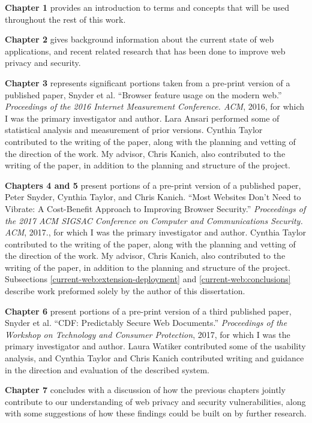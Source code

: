 \authorcontributions

\textbf{Chapter 1} provides an introduction to terms and concepts that will be
used throughout the rest of this work.

\textbf{Chapter 2} gives background information about the current state of web
applications, and recent related research that has been done to improve web
privacy and security.

\textbf{Chapter 3} represents significant portions taken from a pre-print
version of a published paper, Snyder et al. ``Browser feature usage on
the modern web.'' \textit{Proceedings of the 2016 Internet Measurement
Conference. ACM}, 2016, for which I was the primary investigator and author.
Lara Ansari performed some of statistical analysis and measurement of prior \FF
versions.  Cynthia Taylor contributed to the writing of the paper, along with
the planning and vetting of the direction of the work.  My advisor, Chris
Kanich, also contributed to the writing of the paper, in addition to the
planning and structure of the project.

\textbf{Chapters 4 and 5} present portions of a pre-print version of a
published paper, Peter Snyder, Cynthia Taylor, and Chris Kanich. ``Most
Websites Don't Need to Vibrate: A Cost-Benefit Approach to Improving Browser
Security.'' \textit{Proceedings of the 2017 ACM SIGSAC Conference on Computer
and Communications Security. ACM}, 2017., for which I was the primary
investigator and author.  Cynthia Taylor contributed to the writing of the
paper, along with the planning and vetting of the direction of the work.  My
advisor, Chris Kanich, also contributed to the writing of the paper, in
addition to the planning and structure of the project.  Subsections
\ref{current-web:extension-deployment} and \ref{current-web:conclusions}
describe work preformed solely by the author of this dissertation.

\textbf{Chapter 6} present portions of a pre-print version of a third published
paper, Snyder et al. ``CDF: Predictably Secure Web Documents.''
\textit{Proceedings of the Workshop on Technology and Consumer Protection},
2017, for which I was the primary investigator and author.  Laura Watiker
contributed some of the usability analysis, and Cynthia Taylor and Chris
Kanich contributed writing and guidance in the direction and evaluation of the
described system.

\textbf{Chapter 7} concludes with a discussion of how the previous chapters
jointly contribute to our understanding of web privacy and security
vulnerabilities, along with some suggestions of how these findings could be
built on by further research.

